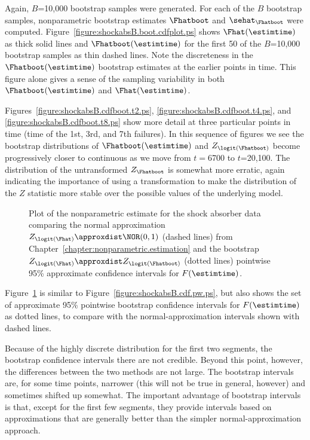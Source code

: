 \begin{example}
Again, $B$=10,000 bootstrap samples were generated. For each of the
$B$ bootstrap samples, nonparametric bootstrap estimates $\Fhatboot$
and $\sehat_{\Fhatboot}$ were computed.
Figure~\ref{figure:shockabsB.boot.cdfplot.ps} shows
$\Fhat(\estimtime)$ as thick solid lines and $\Fhatboot(\estimtime)$
for the first 50 of the $B$=10,000 bootstrap samples as thin dashed
lines.  Note the discreteness in the $\Fhatboot(\estimtime)$
bootstrap estimates at the earlier points in time. This figure alone
gives a sense of the sampling variability in both
$\Fhatboot(\estimtime)$ and $\Fhat(\estimtime)$.

Figures~\ref{figure:shockabsB.cdfboot.t2.ps},
\ref{figure:shockabsB.cdfboot.t4.ps}, and 
\ref{figure:shockabsB.cdfboot.t8.ps} show more detail at three
particular points in time (time of the 1st, 3rd, and 7th failures).
In this sequence of figures we see the bootstrap distributions of
$\Fhatboot(\estimtime)$ and $Z_{\logit(\Fhatboot)}$ become
progressively closer to continuous as we move from
$t=$6700 to $t$=20,100. The distribution of
the untransformed $Z_{\Fhatboot}$ is somewhat more erratic, again
indicating the importance of using a transformation to make the
distribution of the $Z$ statistic more stable over the possible values
of the underlying model.

\begin{figure}
\caption{Plot of the nonparametric estimate
for the shock absorber data comparing the normal approximation
$Z_{\logit(\Fhat)} \approxdist \NOR(0,1)$ (dashed lines) from
Chapter~\ref{chapter:nonparametric.estimation} and the bootstrap
$Z_{\logit(\Fhat)} \approxdist Z_{\logit(\Fhatboot)}$ (dotted lines)
pointwise 95\% approximate confidence intervals for
$F(\estimtime)$.}
\label{figure:shockabsB.cdf.boot.nor.pw.ps}
\end{figure}
Figure~\ref{figure:shockabsB.cdf.boot.nor.pw.ps} is similar to
Figure~\ref{figure:shockabsB.cdf.pw.ps}, but also shows the set of
approximate 95\% pointwise bootstrap confidence intervals for
$F(\estimtime)$ as dotted lines, to compare with the normal-approximation
intervals shown with dashed lines. 
\end{example}
Because of the highly discrete distribution for the first two
segments, the bootstrap confidence intervals there are not credible.
Beyond this point, however, the differences between the two methods
are not large. The bootstrap intervals are, for some time points,
narrower (this will not be true in general, however) and sometimes
shifted up somewhat.  The important advantage of bootstrap intervals
is that, except for the first few segments, they provide intervals
based on approximations that are generally better than the simpler
normal-approximation approach.


